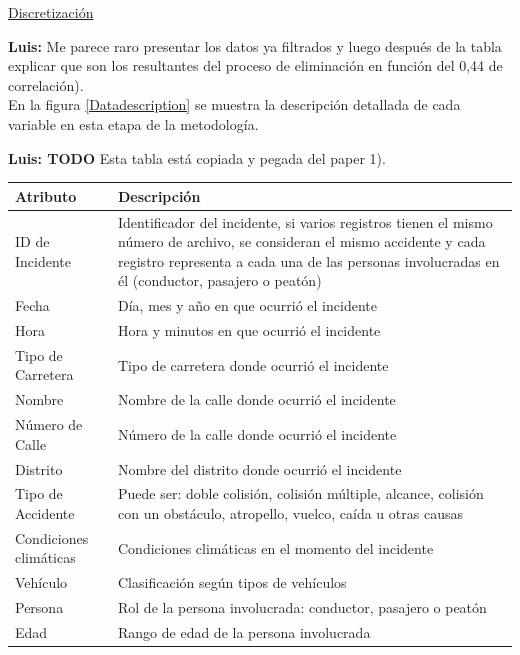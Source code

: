 \documentclass{uathesis-es}
\begin{document}
\underline{Discretización}

\textbf{Luis: } Me parece raro presentar los datos ya filtrados y luego después de la tabla explicar que son los resultantes del proceso de eliminación en función del 0,44 de correlación).\\


En la figura \ref{Datadescription} se muestra la descripción detallada de cada variable en esta etapa de la metodología.

\textbf{Luis: TODO} Esta tabla está copiada y pegada del paper 1).\\
\begin{table}[H]
	\begin{center}
		\begin{tabular}{|p{3cm}|p{12cm}|}
			\hline
			\textbf{Atributo} & \textbf{Descripción} \\ \hline \hline
			ID de Incidente  & Identificador del incidente, si varios registros tienen el mismo número de archivo, se consideran el mismo accidente y cada registro representa a cada una de las personas involucradas en él (conductor, pasajero o peatón)  \\ \hline
			Fecha  & Día, mes y año en que ocurrió el incidente \\ \hline
			Hora  & Hora y minutos en que ocurrió el incidente \\ \hline
			Tipo de Carretera & Tipo de carretera donde ocurrió el incidente \\ \hline
			Nombre & Nombre de la calle donde ocurrió el incidente \\ \hline
			Número de Calle & Número de la calle donde ocurrió el incidente  \\ \hline
			Distrito & Nombre del distrito donde ocurrió el incidente \\ \hline
			Tipo de Accidente  & Puede ser: doble colisión, colisión múltiple, alcance, colisión con un obstáculo, atropello, vuelco, caída u otras causas \\ \hline
			Condiciones climáticas  & Condiciones climáticas en el momento del incidente \\ \hline
			Vehículo  & Clasificación según tipos de vehículos \\ \hline
			Persona  & Rol de la persona involucrada: conductor, pasajero o peatón \\ \hline
			Edad  & Rango de edad de la persona involucrada \\ \hline

\end{tabular}
\end{center}
\end{table}
\end{document}
